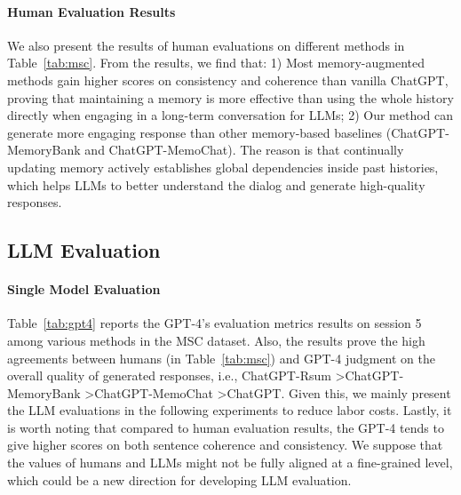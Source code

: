 \documentclass[authoryear,preprint,review,12pt]{elsarticle}
\begin{document}
\paragraph*{Human Evaluation Results} We also present the results of human evaluations on different methods in Table~\ref{tab:msc}.
From the results, we find that: 1) Most memory-augmented methods gain higher scores on consistency and coherence than vanilla ChatGPT, proving that maintaining a memory is more effective than using the whole history directly when engaging in a long-term conversation for LLMs; 2) Our method can generate more engaging response than other memory-based baselines (ChatGPT-MemoryBank and ChatGPT-MemoChat). The reason is that continually updating memory actively establishes global dependencies inside past histories, which helps LLMs to better understand the dialog and generate high-quality responses. 

\subsection{LLM Evaluation} 
\paragraph*{Single Model Evaluation} Table~\ref{tab:gpt4} reports the GPT-4's evaluation metrics results on session 5 among various methods in the MSC dataset. Also, the results prove the high agreements between humans (in Table~\ref{tab:msc}) and GPT-4 judgment on the overall quality of generated responses, i.e., ChatGPT-Rsum \textgreater ChatGPT-MemoryBank \textgreater  ChatGPT-MemoChat \textgreater  ChatGPT. Given this, we mainly present the LLM evaluations in the following experiments to reduce labor costs. Lastly, it is worth noting that compared to human evaluation results, the GPT-4 tends to give higher scores on both sentence coherence and consistency. We suppose that the values of humans and LLMs might not be fully aligned at a fine-grained level, which could be a new direction for developing LLM evaluation.
\begin{table}[t]
\centering
\caption{\textbf{Comparison of evaluation metrics results by GPT-4} across different methods on session 5 in MSC dataset.}
\label{tab:gpt4}
\end{table}
\end{document}
